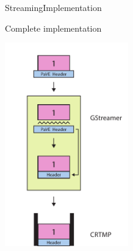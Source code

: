 \begin{frame}{Streaming}{Implementation}
  \begin{block}{Complete implementation}
    \begin{center}
      \includegraphics[width=0.4\textwidth]{images/stream_what_we_should_have_done.pdf}
    \end{center}
  \end{block}
\end{frame}